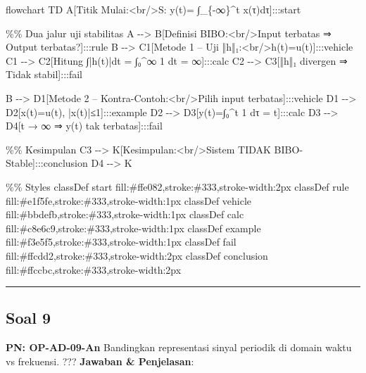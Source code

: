 \documentclass[
  letterpaper,
  DIV=11,
  numbers=noendperiod]{scrreprt}
\newenvironment{Shaded}{\begin{snugshade}}{\end{snugshade}}
\newcommand{\NormalTok}[1]{\textcolor[rgb]{0.00,0.23,0.31}{#1}}
\begin{document}
\begin{Shaded}
\begin{Highlighting}[]
\NormalTok{flowchart TD}
\NormalTok{    A[Titik Mulai:\textless{}br/\textgreater{}S: y(t)= ∫\_\{{-}∞\}\^{}t x(τ)dτ]:::start}

\NormalTok{    \%\% Dua jalur uji stabilitas}
\NormalTok{    A {-}{-}\textgreater{} B[Definisi BIBO:\textless{}br/\textgreater{}Input terbatas ⇒ Output terbatas?]:::rule}
\NormalTok{    B {-}{-}\textgreater{} C1[Metode 1 – Uji ‖h‖₁:\textless{}br/\textgreater{}h(t)=u(t)]:::vehicle}
\NormalTok{    C1 {-}{-}\textgreater{} C2[Hitung ∫|h(t)|dt = ∫₀\^{}∞ 1 dt = ∞]:::calc}
\NormalTok{    C2 {-}{-}\textgreater{} C3[‖h‖₁ divergen ⇒ Tidak stabil]:::fail}

\NormalTok{    B {-}{-}\textgreater{} D1[Metode 2 – Kontra{-}Contoh:\textless{}br/\textgreater{}Pilih input terbatas]:::vehicle}
\NormalTok{    D1 {-}{-}\textgreater{} D2[x(t)=u(t), |x(t)|≤1]:::example}
\NormalTok{    D2 {-}{-}\textgreater{} D3[y(t)=∫₀\^{}t 1 dτ = t]:::calc}
\NormalTok{    D3 {-}{-}\textgreater{} D4[t → ∞ ⇒ y(t) tak terbatas]:::fail}

\NormalTok{    \%\% Kesimpulan}
\NormalTok{    C3 {-}{-}\textgreater{} K[Kesimpulan:\textless{}br/\textgreater{}Sistem TIDAK BIBO{-}Stable]:::conclusion}
\NormalTok{    D4 {-}{-}\textgreater{} K}

\NormalTok{    \%\% Styles}
\NormalTok{    classDef start fill:\#ffe082,stroke:\#333,stroke{-}width:2px}
\NormalTok{    classDef rule fill:\#e1f5fe,stroke:\#333,stroke{-}width:1px}
\NormalTok{    classDef vehicle fill:\#bbdefb,stroke:\#333,stroke{-}width:1px}
\NormalTok{    classDef calc fill:\#c8e6c9,stroke:\#333,stroke{-}width:1px}
\NormalTok{    classDef example fill:\#f3e5f5,stroke:\#333,stroke{-}width:1px}
\NormalTok{    classDef fail fill:\#ffcdd2,stroke:\#333,stroke{-}width:2px}
\NormalTok{    classDef conclusion fill:\#ffccbc,stroke:\#333,stroke{-}width:2px}
\end{Highlighting}
\end{Shaded}

\begin{center}\rule{0.5\linewidth}{0.5pt}\end{center}

\subsection{Soal 9}\label{soal-9}

\textbf{PN: OP-AD-09-An} Bandingkan representasi sinyal periodik di
domain waktu vs frekuensi. ??? \textbf{Jawaban \& Penjelasan}:
\end{document}
